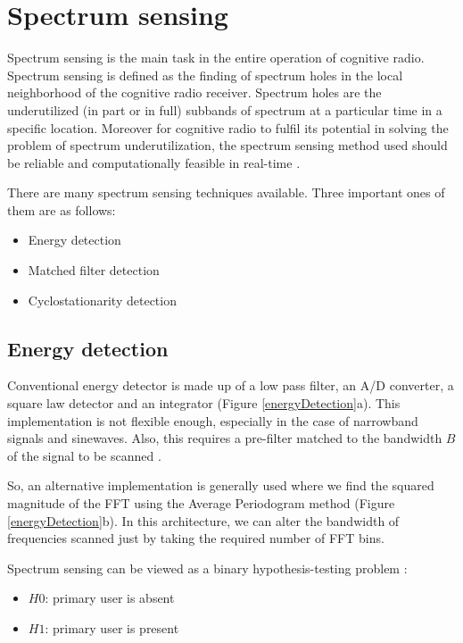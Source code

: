 \chapter{Spectrum sensing}

Spectrum sensing is the main task in the entire operation of cognitive
radio. Spectrum sensing is defined as the finding of spectrum holes in 
the local neighborhood of the cognitive radio receiver. Spectrum holes are the
underutilized (in part or in full) subbands of spectrum at a particular time
in a specific location. Moreover for cognitive radio to fulfil its potential
in solving the problem of spectrum underutilization, the spectrum sensing 
method used should be reliable and computationally feasible in real-time 
\cite{haykin09}.

There are many spectrum sensing techniques available. Three important ones of
them are as follows:
\begin{itemize}
    \item Energy detection
    \item Matched filter detection
    \item Cyclostationarity detection
\end{itemize}

\section{Energy detection}

Conventional energy detector is made up of a low pass filter, an A/D 
converter, a square law detector and an integrator (Figure 
\ref{energyDetection}a). This implementation is not flexible enough, 
especially in the case of narrowband signals and sinewaves. Also, this 
requires a pre-filter matched to the bandwidth $B$ of the signal to be scanned
\cite{cabric06}.

So, an alternative implementation is generally used where we find the squared 
magnitude of the FFT using the Average Periodogram method (Figure 
\ref{energyDetection}b). In this architecture, we can alter the bandwidth of
frequencies scanned just by taking
the required number of FFT bins. 

Spectrum sensing can be viewed as a binary hypothesis-testing problem 
\cite{zhang09}:
\begin{itemize}
    \item $H0$: primary user is absent
    \item $H1$: primary user is present
\end{itemize}


